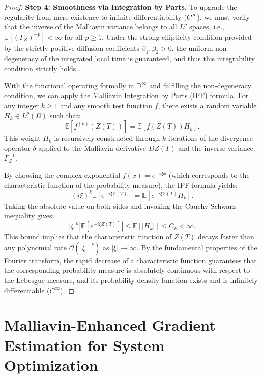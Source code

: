 \documentclass[11pt]{article}
\begin{document}
\begin{proof}
\textbf{Step 4: Smoothness via Integration by Parts.} To upgrade the regularity from mere existence to infinite differentiability ($C^\infty$), we must verify that the inverse of the Malliavin variance belongs to all $L^p$ spaces, i.e., $\mathbb{E}[(\Gamma_Z)^{-p}] < \infty$ for all $p \geq 1$. Under the strong ellipticity condition provided by the strictly positive diffusion coefficients $\beta_1, \beta_2 > 0$, the uniform non-degeneracy of the integrated local time is guaranteed, and thus this integrability condition strictly holds \citet[Theorem 2.1.4 and Section 2.1.5]{nualart2006malliavin}.

With the functional operating formally in $\mathbb{D}^\infty$ and fulfilling the non-degeneracy condition, we can apply the Malliavin Integration by Parts (IPF) formula. For any integer $k \geq 1$ and any smooth test function $f$, there exists a random variable $H_k \in L^p(\Omega)$ such that:
\begin{equation}
    \mathbb{E}[f^{(k)}(Z(T))] = \mathbb{E}[f(Z(T)) H_k].
\end{equation}
This weight $H_k$ is recursively constructed through $k$ iterations of the divergence operator $\delta$ applied to the Malliavin derivative $D Z(T)$ and the inverse variance $\Gamma_Z^{-1}$. 

By choosing the complex exponential $f(x) = e^{-i \xi x}$ (which corresponds to the characteristic function of the probability measure), the IPF formula yields:
\begin{equation}
    (i\xi)^k \mathbb{E}[e^{-i \xi Z(T)}] = \mathbb{E}[e^{-i \xi Z(T)} H_k].
\end{equation}
Taking the absolute value on both sides and invoking the Cauchy-Schwarz inequality gives:
\begin{equation}
    |\xi|^k |\mathbb{E}[e^{-i \xi Z(T)}]| \leq \mathbb{E}[|H_k|] \leq C_k < \infty.
\end{equation}
This bound implies that the characteristic function of $Z(T)$ decays faster than any polynomial rate $\mathcal{O}(|\xi|^{-k})$ as $|\xi| \to \infty$. By the fundamental properties of the Fourier transform, the rapid decrease of a characteristic function guarantees that the corresponding probability measure is absolutely continuous with respect to the Lebesgue measure, and its probability density function exists and is infinitely differentiable ($C^\infty$).
\end{proof}

\section{Malliavin-Enhanced Gradient Estimation for System Optimization}\label{sec:importance_sampling}
\end{document}
